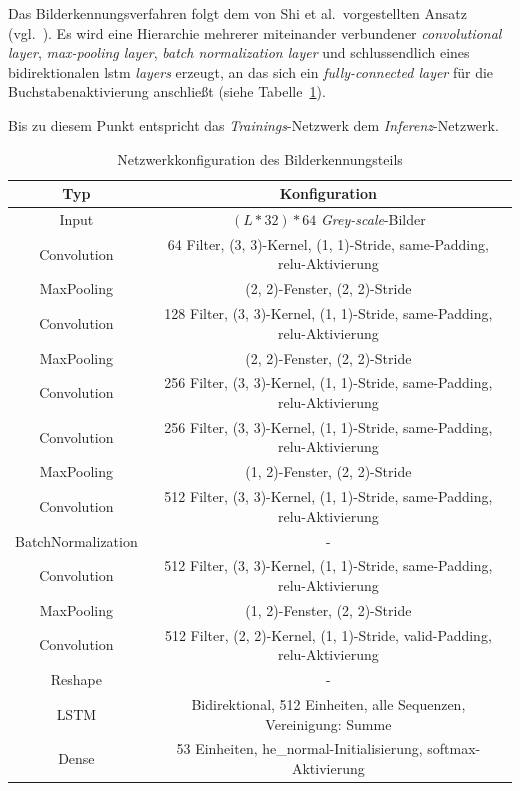 Das Bilderkennungsverfahren folgt dem von Shi et al.\ vorgestellten Ansatz (vgl.~\cite{shi2017}). Es wird eine
Hierarchie mehrerer miteinander verbundener \textit{convolutional layer}, \textit{max-pooling layer},
\textit{batch normalization layer} und schlussendlich eines bidirektionalen \gls{lstm} \textit{layers} erzeugt, an das
sich ein \textit{fully-connected layer} für die Buchstabenaktivierung anschließt (siehe
Tabelle~\ref{daten:bilderkennung:conv}).

Bis zu diesem Punkt entspricht das \textit{Trainings}-Netzwerk dem \textit{Inferenz}-Netzwerk.

\begin{table}
    \caption{Netzwerkkonfiguration des Bilderkennungsteils}
    \centering
    \begin{tabular}{|c|c|}
        \hline
        \textbf{Typ} & \textbf{Konfiguration}\\ \hline \hline
        Input & $(L * 32) * 64$ \textit{Grey-scale}-Bilder\\ \hline
        Convolution & 64 Filter, (3, 3)-Kernel, (1, 1)-Stride, same-Padding, relu-Aktivierung\\ \hline
        MaxPooling & (2, 2)-Fenster, (2, 2)-Stride\\ \hline
        Convolution & 128 Filter, (3, 3)-Kernel, (1, 1)-Stride, same-Padding, relu-Aktivierung\\ \hline
        MaxPooling & (2, 2)-Fenster, (2, 2)-Stride\\ \hline
        Convolution & 256 Filter, (3, 3)-Kernel, (1, 1)-Stride, same-Padding, relu-Aktivierung\\ \hline
        Convolution & 256 Filter, (3, 3)-Kernel, (1, 1)-Stride, same-Padding, relu-Aktivierung\\ \hline
        MaxPooling & (1, 2)-Fenster, (2, 2)-Stride\\ \hline
        Convolution & 512 Filter, (3, 3)-Kernel, (1, 1)-Stride, same-Padding, relu-Aktivierung\\ \hline
        BatchNormalization & - \\ \hline
        Convolution & 512 Filter, (3, 3)-Kernel, (1, 1)-Stride, same-Padding, relu-Aktivierung\\ \hline
        MaxPooling & (1, 2)-Fenster, (2, 2)-Stride\\ \hline
        Convolution & 512 Filter, (2, 2)-Kernel, (1, 1)-Stride, valid-Padding, relu-Aktivierung\\ \hline
        Reshape & - \\ \hline
        LSTM & Bidirektional, 512 Einheiten, alle Sequenzen, Vereinigung: Summe\\ \hline
        Dense & 53 Einheiten, he\_normal-Initialisierung, softmax-Aktivierung\\ \hline
    \end{tabular}
    \label{daten:bilderkennung:conv}
\end{table}

